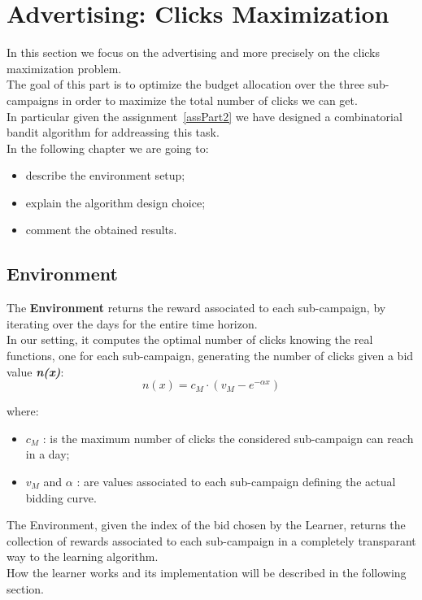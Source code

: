 \chapter{Advertising: Clicks Maximization}

In this section we focus on the advertising and more precisely on the clicks maximization problem.\\
The goal of this part is to optimize the budget allocation over the three sub-campaigns in order to maximize the total number of clicks we can get.\\
In particular given the assignment~\ref{assPart2} we have designed a combinatorial bandit algorithm for addreassing this task.\\
In the following chapter we are going to:
\begin{itemize}
	\item describe the environment setup;
	\item explain the algorithm design choice;
	\item comment the obtained results.
\end{itemize}

\section{Environment}
The \textbf{Environment} returns the reward associated to each sub-campaign, by iterating over the days for the entire time horizon.\\
In our setting, it computes the optimal number of clicks knowing the real functions, one for each sub-campaign, generating  the number of clicks given a bid value \textbf{\textit{n(x)}}:\\

\begin{equation}
	n(x) = c_{M} \cdot (v_{M} - e^{-\alpha x})
\end{equation}

where:
\begin{itemize}
	\item $c_{M}$ : is the maximum number of clicks the considered sub-campaign can reach in a day;
	\item $v_{M}$ and $\alpha$ : are values associated to each sub-campaign defining the actual bidding curve.
\end{itemize}


The Environment, given the index of the bid chosen by the Learner, returns the collection of rewards associated to each sub-campaign in a completely transparant way to the learning algorithm.\\
How the learner works and its implementation will be described in the following section.



